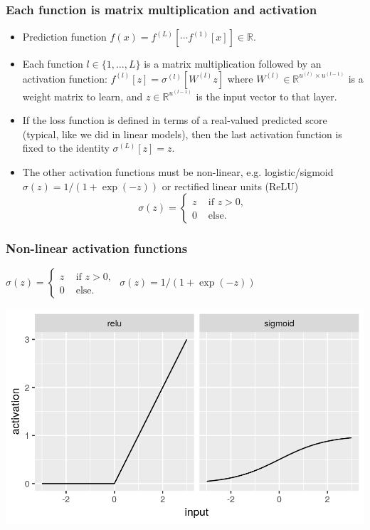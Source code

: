 \documentclass{beamer}
\begin{document}
\begin{frame}
  \frametitle{Each function is matrix multiplication and activation}
  \begin{itemize}
  \item Prediction function $f(x)=f^{(L)}[\cdots f^{(1)}[x] ]\in\mathbb R$.
  \item Each function $l\in\{1,\dots, L\}$ is a matrix multiplication
    followed by an activation function:
    $f^{(l)}[z] = \sigma^{(l)}[ W^{(l)} z ]$ where
    $W^{(l)}\in\mathbb R^{u^{(l)}\times u^{(l-1)}}$ is a weight matrix
    to learn, and $z\in\mathbb R^{u^{(l-1)}}$ is the input vector to
    that layer.
  \item If the loss function is defined in terms of a real-valued
    predicted score (typical, like we did in linear models), then the
    last activation function is fixed to the identity
    $\sigma^{(L)}[z]=z$.
\item The other activation functions must be
non-linear, e.g. 
logistic/sigmoid $\sigma(z)=1/(1+\exp(-z))$ or rectified linear units (ReLU) 
$$
\sigma(z)=
\begin{cases}
  z & \text{ if } z>0,\\
  0 & \text{ else.}
\end{cases}
$$ 
\end{itemize}
\end{frame}

\begin{frame}
  \frametitle{Non-linear activation functions}
$
\sigma(z)=
\begin{cases}
  z & \text{ if } z>0,\\
  0 & \text{ else.}
\end{cases}
$
  \hskip 1in
  $\sigma(z)=1/(1+\exp(-z))$

  \includegraphics[width=\textwidth]{figure-activations}

\end{frame}
\end{document}
